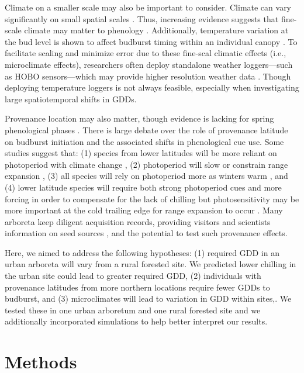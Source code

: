 \documentclass{article}\usepackage[]{graphicx}\usepackage[]{color}
\begin{document}
Climate on a smaller scale may also be important to consider. Climate can vary significantly on small spatial scales \citep[][e.g., as much as 2.6$^{\circ}$C between sensors at the same vineyard or up to 6.6$^{\circ}$C within 1 km spatial units in northern Europe]{deResseguier2020,Lenoir2013}. Thus, increasing evidence suggests that fine-scale climate may matter to phenology \citep{Lembrechts2019}. Additionally, temperature variation at the bud level is shown to affect budburst timing within an individual canopy \citep{Lembrechts2019}. To facilitate scaling and minimize error due to these fine-scal climatic effects (i.e., microclimate effects), researchers often deploy standalone weather loggers---such as HOBO sensors---which may provide higher resolution weather data \citep{Schwartz2013a,Whiteman2000}. Though deploying temperature loggers is not always feasible, especially when investigating large spatiotemporal shifts in GDDs. 
  
Provenance location may also matter, though evidence is lacking for spring phenological phases \citep{Aitken2015, McKown2013}. There is large debate over the role of provenance latitude on budburst initiation and the associated shifts in phenological cue use. Some studies suggest that: (1) species from lower latitudes will be more reliant on photoperiod with climate change \citep{Zohner2016}, (2) photoperiod will slow or constrain range expansion \citep{Saikkonen2012}, (3) all species will rely on photoperiod more as winters warm \citep{Way2015}, and (4) lower latitude species will require both strong photoperiod cues and more forcing in order to compensate for the lack of chilling but photosensitivity may be more important at the cold trailing edge for range expansion to occur \citep{Gauzere2017}. Many arboreta keep diligent acquisition records, providing visitors and scientists information on seed sources \citep{Dosmann2006}, and the potential to test such provenance effects.

Here, we aimed to address the following hypotheses: (1) required GDD in an urban arboreta will vary from a rural forested site. We predicted lower chilling in the urban site could lead to greater required GDD, (2) individuals with provenance latitudes from more northern locations require fewer GDDs to budburst, and (3) microclimates will lead to variation in GDD within sites,. We tested these in one urban arboretum and one rural forested site and we additionally incorporated simulations to help better interpret our results. 

\section*{Methods}
\end{document}
